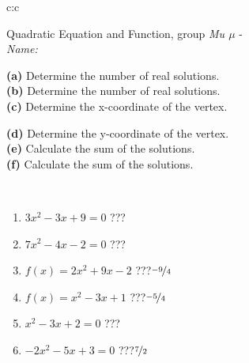 \documentclass[10pt]{report}
\begin{document}
\begin{tabular}{c:c}
\begin{minipage}[c][104.5mm][t]{0.5\linewidth}
\begin{center}
\vspace{7mm}
{\huge {\LARGE Quadratic Equation and Function}, group \textit{Mu $\mu$} -}\\[5mm]
\textit{Name:}\phantom{xxxxxxxxxxxxxxxxxxxxxxxxxxxxxxxxxxxxxxxxxxxxxxxxxxxxxxxxxxxxxxxxx}\\[5mm]
\begin{minipage}{0.95\linewidth}
\begin{center}
{\small \begin{minipage}{0.5\textwidth}
\textbf{(a)} Determine the number of real solutions. \\[1mm]
\textbf{(b)} Determine the number of real solutions. \\[1mm]
\textbf{(c)} Determine the x-coordinate of the vertex.
\end{minipage} \begin{minipage}{0.49\textwidth}
\textbf{(d)} Determine the y-coordinate of the vertex. \\[1mm]
\textbf{(e)} Calculate the sum of the solutions. \\[1mm]
\textbf{(f)} Calculate the sum of the solutions.
\end{minipage}
}
\end{center}
\end{minipage}
\\[4mm]
\begin{minipage}{0.79\linewidth}
\begin{center}
\begin{varwidth}{\linewidth}
\begin{enumerate}
\Large
\item $3x^2-3x+9=0$\quad \dotfill\; ???\;\dotfill {}
\item $7x^2-4x-2=0$\quad \dotfill\; ???\;\dotfill {}
\item $f(x)=2x^2+9x-2$\quad \dotfill\; ???\;\dotfill \quad $\nicefrac{-9}{4}$
\item $f(x)=x^2-3x+1$\quad \dotfill\; ???\;\dotfill \quad $\nicefrac{-5}{4}$
\item $x^2-3x+2=0$\quad \dotfill\; ???\;\dotfill {}
\item $-2x^2-5x+3=0$\quad \dotfill\; ???\;\dotfill \quad $\nicefrac{7}{2}$
\end{enumerate}
\end{varwidth}

\end{center}
\end{minipage}
\end{center}
\end{minipage}
\end{tabular}
\end{document}
